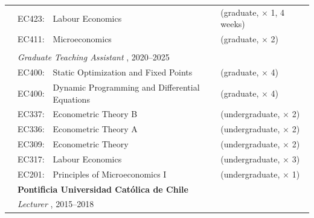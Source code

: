 \begin{tabular}{llll}
	  
	  \indent
	  
	& EC423:
	& Labour Economics
	& (graduate, $\times$ 1, 4 weeks)
	\\

	
	& EC411:
	& Microeconomics
	& (graduate, $\times$ 2)
	\\%
	
	& \hphantom{EAE250A:}
	& \hphantom{Dynamic Programming and Differential Equations}
	&
	\\
	
	
	&
	\multicolumn{3}{l}{
		\textit{%
			Graduate Teaching Assistant%
		}%
		,
		2020--2025
	}
	\\[.5ex]
	
	& EC400:
	& Static Optimization and Fixed Points
	& (graduate, $\times$ 4)
%	
	\\
	
	& EC400:
	& Dynamic Programming and Differential Equations
	& (graduate, $\times$ 4)
	\\
	
	& EC337:
	& Econometric Theory B
	& (undergraduate, $\times$ 2)
	\\%
	
	& EC336:
	& Econometric Theory A
	& (undergraduate, $\times$ 2)
	\\%
	  
	& EC309:
	& Econometric Theory
	& (undergraduate, $\times$ 2)
	\\%
	
	& EC317:
	& Labour Economics
	& (undergraduate, $\times$ 3)
	\\%
	
	& EC201:
	& Principles of Microeconomics I
	& (undergraduate, $\times$ 1)
	\\[1em]
	
	
	&
	\multicolumn{3}{l}{
		\textbf{%
			Pontificia Universidad Cat\'olica de Chile
		}
	}
	\\[1ex]
	
	
	&
	\multicolumn{3}{l}{
		\textit{%
			Lecturer%
		}%
		,
		2015--2018
	}
	\\[.5ex]
	

\end{tabular}
